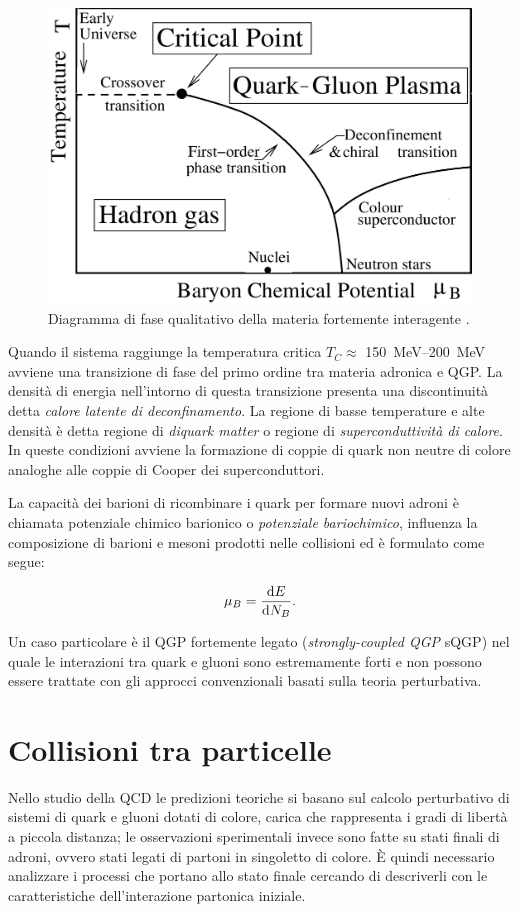     \begin{figure}[h]
        \centering
        \includegraphics[width=0.7\linewidth]{res/fig/1-chapter/3-PhasDiagQGP.png}
        \caption{Diagramma di fase qualitativo della materia fortemente interagente \cite{Wikipedia_PhasDiagQGP}.}
        \label{fig:3-phase-diag-qgp}
    \end{figure}
    
    Quando il sistema raggiunge la temperatura critica $T_C \approx$ \qtyrange[range-phrase = --, range-units = single]{150}{200}{\mega \eV} avviene una transizione di fase del primo ordine tra materia adronica e QGP. La densità di energia nell'intorno di questa transizione presenta una discontinuità detta \textit{calore latente di deconfinamento}. La regione di basse temperature e alte densità è detta regione di \textit{diquark matter} o regione di \textit{superconduttività di calore}. In queste condizioni avviene la formazione di coppie di quark non neutre di colore analoghe alle coppie di Cooper dei superconduttori.

    La capacità dei barioni di ricombinare i quark per formare nuovi adroni è chiamata potenziale chimico barionico o \textit{potenziale bariochimico}, influenza la composizione di barioni e mesoni prodotti nelle collisioni ed è formulato come segue:
    
    \begin{equation}
        \mu_B = \dv{E}{N_B}.
    \end{equation}

    Un caso particolare è il QGP fortemente legato (\textit{strongly-coupled QGP} sQGP) nel quale le interazioni tra quark e gluoni sono estremamente forti e non possono essere trattate con gli approcci convenzionali basati sulla teoria perturbativa.

\section{Collisioni tra particelle}
\label{sec:COLLISION}
    Nello studio della QCD le predizioni teoriche si basano sul calcolo perturbativo di sistemi di quark e gluoni dotati di colore, carica che rappresenta i gradi di libertà a piccola distanza; le osservazioni sperimentali invece sono fatte su stati finali di adroni, ovvero stati legati di partoni in singoletto di colore. È quindi necessario analizzare i processi che portano allo stato finale cercando di descriverli con le caratteristiche dell'interazione partonica iniziale.

